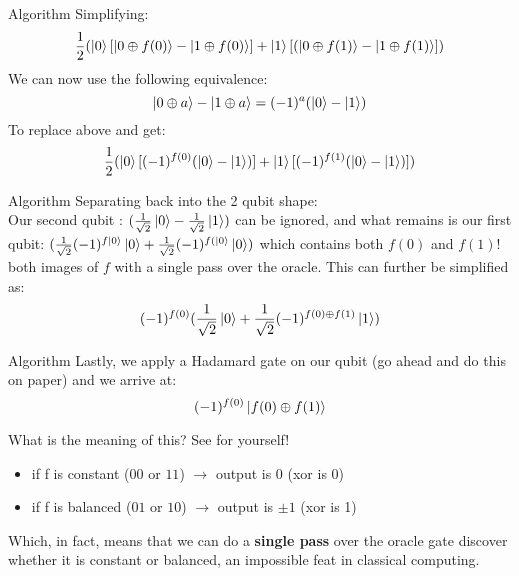 \documentclass[aspectratio=43]{beamer}
\begin{document}
\begin{frame}{\ds Algorithm}
Simplifying:
\begin{equation*}
    \frac{1}{2}(
        \ket{0} [\ket{0\oplus f(0)} - \ket{1\oplus f(0)}]
        +  
        \ket{1} [(\ket{0\oplus f(1)} - \ket{1\oplus f(1)}]
    )
\end{equation*}
We can now use the following equivalence:
\begin{equation*}
    \ket{0 \oplus a} - \ket{1 \oplus a} =  (-1)^a(\ket{0} - \ket{1})
\end{equation*}
To replace above and get:
\begin{equation*}
    \frac{1}{2}(
        \ket{0} [(-1)^{f(0)}(\ket{0} - \ket{1})]
        +  
        \ket{1} [(-1)^{f(1)}(\ket{0} - \ket{1})]
    )
\end{equation*}
\pagenumber
\end{frame}


\begin{frame}{\ds Algorithm}
Separating back into the 2 qubit shape:
\begin{equation*}
    [\osqrt (-1)^{f\kz} \kz + \osqrt (-1)^{f(\kz}\kz][\osqrt \kz - \osqrt \ko]
\end{equation*}
Our second qubit : $(\frac{1}{\sqrt{2}} \ket{0} - \frac{1}{\sqrt{2}} \ket{1})$ can be ignored, and what remains is our first qubit: $(\frac{1}{\sqrt{2}} (-1)^{f\ket{0}} \ket{0} + \frac{1}{\sqrt{2}} (-1)^{f(\ket{0}}\ket{0})$ which contains both $f(0)$ and $f(1)$! both images of $f$ with a single pass over the oracle. This can further be simplified as:
\begin{equation*}
    (-1)^{f(0)}(\frac{1}{\sqrt{2}} \ket{0} + \frac{1}{\sqrt{2}} (-1)^{f(0) \oplus f(1)} \ket{1})
\end{equation*}
\pagenumber
\end{frame}

\begin{frame}{\ds Algorithm}
Lastly, we apply a Hadamard gate on our qubit (go ahead and do this on paper) and we arrive at:
\begin{equation*}
    (-1)^{f(0)} \ket{f(0) \oplus f(1)}
\end{equation*}
\begin{cardTiny}
    What is the meaning of this? See for yourself!
    \begin{itemize}
        \item if f is constant ($00$ or $11$) $\rightarrow$ output is $0$ (xor is 0)
        \item if f is balanced ($01$ or $10$) $\rightarrow$ output is $\pm 1$ (xor is 1)
    \end{itemize}
    Which, in fact, means that we can do a\textbf{ single pass} over the oracle gate discover whether it is constant or balanced, an impossible feat in classical computing. 
\end{cardTiny}
\pagenumber
\end{frame}
\end{document}
